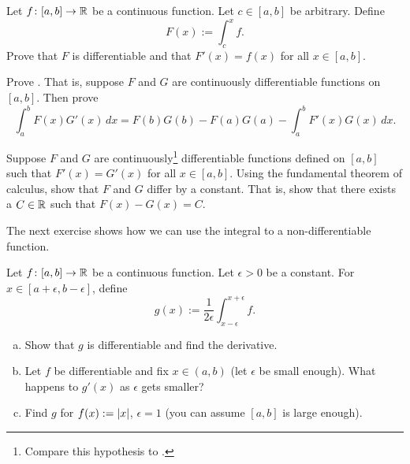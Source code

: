 \begin{exercise} \label{secondftc:exercise}
Let $f \colon [a,b] \to {\mathbb{R}}$ be a continuous function.  Let $c \in [a,b]$
be arbitrary.  Define
\begin{equation*}
F(x) := \int_c^x f .
\end{equation*}
Prove that $F$ is differentiable and that $F'(x) = f(x)$ for all $x \in
[a,b]$.
\end{exercise}

\begin{exercise}
Prove \emph{}.  That is, suppose $F$ and
$G$ are continuously differentiable functions on $[a,b]$.  Then prove
\begin{equation*}
\int_a^b F(x)G'(x)\,dx
=
F(b)G(b)-F(a)G(a)
-
\int_a^b F'(x)G(x)\,dx .
\end{equation*}
\end{exercise}

\begin{exercise}
Suppose $F$ and $G$ are
continuously\footnote{
Compare this hypothesis to .}
differentiable
functions defined on $[a,b]$
such that $F'(x) = G'(x)$ for all $x \in [a,b]$.
Using the fundamental theorem of calculus,
show that $F$ and $G$ differ by a constant.  That is, show that
there exists a $C \in {\mathbb{R}}$ such that
$F(x)-G(x) = C$.
\end{exercise}

\begin{exnote}
The next exercise shows how we can use the integral to  a
non-differentiable function.
\end{exnote}

\begin{exercise} \label{exercise:smoothingout}
Let $f \colon [a,b] \to {\mathbb{R}}$ be a continuous function.  Let $\epsilon > 0$
be a constant.  For $x \in [a+\epsilon,b-\epsilon]$, define
\begin{equation*}
g(x) := \frac{1}{2\epsilon} \int_{x-\epsilon}^{x+\epsilon} f .
\end{equation*}
\begin{enumerate}[a)]
\item
Show that $g$ is differentiable and find the derivative.
\item
Let $f$ be differentiable and fix $x \in (a,b)$ (let $\epsilon$
be small enough).  What happens to $g'(x)$ as $\epsilon$ gets smaller?
\item
Find $g$ for $f(x) := \left\lvert {x} \right\rvert$, $\epsilon = 1$ (you can assume 
$[a,b]$ is large enough).
\end{enumerate}
\end{exercise}

